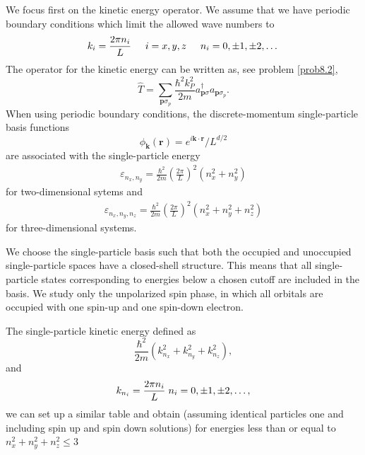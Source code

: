 We focus first on the kinetic energy operator.
We assume that we have periodic boundary conditions which limit the allowed wave numbers to
\[
k_i=\frac{2\pi n_i}{L}\hspace{0.5cm} i=x,y,z \hspace{0.5cm} n_i=0,\pm 1,\pm 2, \dots
\]
The operator for the kinetic energy can be written as, see problem \ref{prob8.2},
\[
\hat{T}=\sum_{\mathbf{p}\sigma_p}\frac{\hbar^2k_P^2}{2m}a_{\mathbf{p}\sigma}^{\dagger}a_{\mathbf{p}\sigma_p}.
\]
When using periodic boundary conditions, the 
discrete-momentum single-particle basis functions 
\[
\phi_{\mathbf{k}}(\mathbf{r}) =
e^{i\mathbf{k}\cdot \mathbf{r}}/L^{d/2}
\]
are associated with 
the single-particle energy   
\begin{align}
  \varepsilon_{n_{x}, n_{y}} = \frac{\hbar^{2}}{2m} \left( \frac{2\pi }{L}\right)^{2}\left( n_{x}^{2} + n_{y}^{2}\right)
\end{align}
for two-dimensional sytems and 
\begin{align}
  \varepsilon_{n_{x}, n_{y}, n_{z}} = \frac{\hbar^{2}}{2m}
  \left( \frac{2\pi }{L}\right)^{2}
  \left( n_{x}^{2} + n_{y}^{2} + n_{z}^{2}\right)
\end{align} 
for three-dimensional systems.


We choose  the single-particle basis such that both the occupied and 
unoccupied single-particle spaces have a closed-shell 
structure. This means that all single-particle states 
corresponding to energies below a chosen cutoff are
included in the basis. We study only the unpolarized spin
phase, in which all orbitals are occupied with one spin-up 
and one spin-down electron. 


The single-particle kinetic energy defined as
\[
\frac{\hbar^2}{2m}\left(k_{n_x}^2+k_{n_y}^2+k_{n_z}^2\right),
\]
and 
\[
k_{n_i}=\frac{2\pi n_i}{L} \hspace{0.1cm} n_i = 0, \pm 1, \pm 2, \dots, 
\]
we can set up a similar table and obtain (assuming identical particles one and including spin up and spin down solutions)  for energies less than or equal to $n_{x}^{2}+n_{y}^{2}+n_{z}^{2}\le 3$


